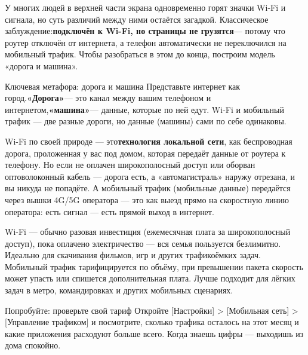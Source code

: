 


У многих людей в верхней части экрана одновременно горят значки Wi-Fi и сигнала, но суть различий между ними остаётся загадкой. Классическое заблуждение:\textbf{подключён к Wi-Fi, но страницы не грузятся}— потому что роутер отключён от интернета, а телефон автоматически не переключился на мобильный трафик. Чтобы разобраться в этом до конца, построим модель «дорога и машина».

\begin{tcbinfo}{Ключевая метафора: дорога и машина}
Представьте интернет как город.\textbf{«Дорога»}— это канал между вашим телефоном и интернетом,\textbf{«машина»}— данные, которые по ней едут. Wi-Fi и мобильный трафик — две разные дороги, но данные (машины) сами по себе одинаковы.

\end{tcbinfo}


Wi-Fi по своей природе — это\textbf{технология локальной сети}, как беспроводная дорога, проложенная у вас под домом, которая передаёт данные от роутера к телефону. Но если не оплачен широкополосный доступ или оборван оптоволоконный кабель — дорога есть, а «автомагистраль» наружу отрезана, и вы никуда не попадёте. А мобильный трафик (мобильные данные) передаётся через вышки 4G/5G оператора — это как выезд прямо на скоростную линию оператора: есть сигнал — есть прямой выход в интернет.


Wi-Fi — обычно разовая инвестиция (ежемесячная плата за широкополосный доступ), пока оплачено электричество — вся семья пользуется безлимитно. Идеально для скачивания фильмов, игр и других трафикоёмких задач. Мобильный трафик тарифицируется по объёму, при превышении пакета скорость может упасть или спишется дополнительная плата. Лучше подходит для лёгких задач в метро, командировках и других мобильных сценариях.

\begin{tcbpractice}{Попробуйте: проверьте свой тариф}
Откройте [Настройки] > [Мобильная сеть] > [Управление трафиком] и посмотрите, сколько трафика осталось на этот месяц и какие приложения расходуют больше всего. Когда знаешь цифры — выходишь из дома спокойно.

\end{tcbpractice}

